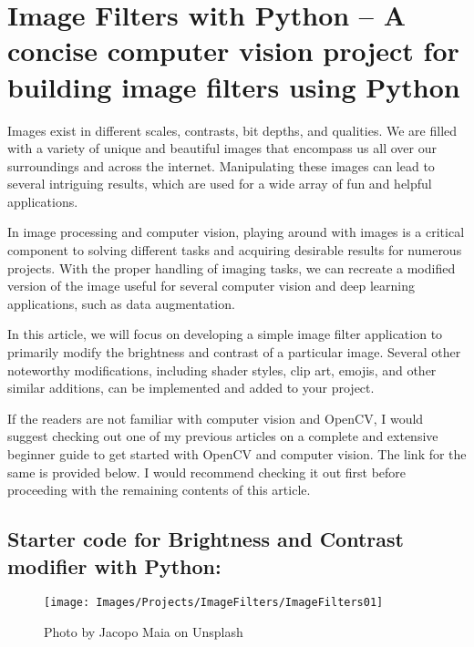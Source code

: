 %
%
%
%





\chapter{Image Filters with Python --
    A concise computer vision project for building image filters using Python}

Images exist in different scales, contrasts, bit depths, and qualities. We are filled with a variety of unique and beautiful images that encompass us all over our surroundings and across the internet. Manipulating these images can lead to several intriguing results, which are used for a wide array of fun and helpful applications.

In image processing and computer vision, playing around with images is a critical component to solving different tasks and acquiring desirable results for numerous projects. With the proper handling of imaging tasks, we can recreate a modified version of the image useful for several computer vision and deep learning applications, such as data augmentation.

In this article, we will focus on developing a simple image filter application to primarily modify the brightness and contrast of a particular image. Several other noteworthy modifications, including shader styles, clip art, emojis, and other similar additions, can be implemented and added to your project.

If the readers are not familiar with computer vision and OpenCV, I would suggest checking out one of my previous articles on a complete and extensive beginner guide to get started with OpenCV and computer vision. The link for the same is provided below. I would recommend checking it out first before proceeding with the remaining contents of this article.


\section{Starter code for Brightness and Contrast modifier with Python:}

\begin{figure}
  \texttt{[image: Images/Projects/ImageFilters/ImageFilters01]}
  \caption{Photo by Jacopo Maia on Unsplash} \label{ImageFilters01}
\end{figure}


